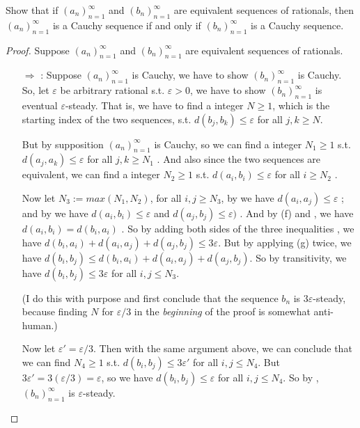 \begin{exercise} \label{exercise 5.2.1}
Show that if \((a_n)_{n = 1}^{\infty}\) and \((b_n)_{n = 1}^{\infty}\) are equivalent sequences of rationals,
then \((a_n)_{n = 1}^{\infty}\) is a Cauchy sequence if and only if \((b_n)_{n = 1}^{\infty}\) is a Cauchy sequence.
\end{exercise}
\begin{proof}
Suppose \((a_n)_{n = 1}^{\infty}\) and \((b_n)_{n = 1}^{\infty}\) are equivalent sequences of rationals.
\begin{itemize}
    \item[\(\Longrightarrow\)]:
        Suppose \((a_n)_{n = 1}^{\infty}\) is Cauchy, we have to show \((b_n)_{n = 1}^{\infty}\) is Cauchy.
        So, let \(\varepsilon\) be arbitrary rational s.t. \(\varepsilon > 0\), we have to show \((b_n)_{n = 1}^{\infty}\) is eventual \(\varepsilon\)-steady.
        That is, we have to find a integer \(N \ge 1\), which is the starting index of the two sequences, s.t. \(d(b_j, b_k) \le \varepsilon\) for all \(j, k \ge N\).
        
        But by supposition \((a_n)_{n = 1}^{\infty}\) is Cauchy, so we can find a integer \(N_1 \ge 1\) s.t. \(d(a_j, a_k) \le \varepsilon\) for all \(j, k \ge N_1\) .
        And also since the two sequences are equivalent, we can find a integer \(N_2 \ge 1\) s.t. \(d(a_i, b_i) \le \varepsilon\) for all \(i \ge N_2\) .
        
        Now let \(N_3 := max(N_1, N_2)\), for all \(i, j \ge N_3\), by  we have \(d(a_i, a_j) \le \varepsilon\) ;
        and by  we have \(d(a_i, b_i) \le \varepsilon\)  and \(d(a_j, b_j) \le \varepsilon)\) .
        And by (f) and , we have \(d(a_i, b_i) = d(b_i, a_i)\) .
        So by adding both sides of the three inequalities , we have \(d(b_i, a_i) + d(a_i, a_j) + d(a_j, b_j) \le 3\varepsilon\).
        But by applying (g) twice, we have \(d(b_i, b_j) \le d(b_i, a_i) + d(a_i, a_j) + d(a_j, b_j)\).
        So by transitivity, we have \(d(b_i, b_j) \le 3\varepsilon\) for all \(i, j \le N_3\).
        
        (I do this with purpose and first conclude that the sequence \(b_n\) is \(3\varepsilon\)-steady, because finding \(N\) for \(\varepsilon/3\) in the \emph{beginning} of the proof is somewhat anti-human.)
        
        Now let \(\varepsilon' = \varepsilon/3\).
        Then with the same argument above, we can conclude that we can find \(N_4 \ge 1\) s.t. \(d(b_i, b_j) \le 3\varepsilon'\) for all \(i, j \le N_4\).
        But \(3\varepsilon' = 3(\varepsilon/3) = \varepsilon\), so we have \(d(b_i, b_j) \le \varepsilon\) for all \(i, j \le N_4\).
        So by , \((b_n)_{n = 1}^{\infty}\) is \(\varepsilon\)-steady.
        

\end{itemize}
\end{proof}
